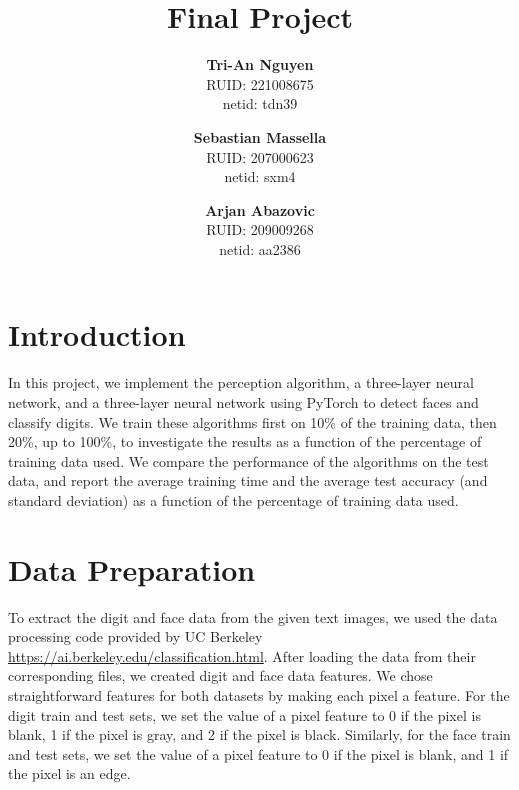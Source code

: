 \documentclass{article}
\begin{document}
\title{Final Project}
\date{}
\author{
\textbf{Tri-An Nguyen}\\
RUID: 221008675\\
netid: tdn39
\and
\textbf{Sebastian Massella}\\
RUID: 207000623\\
netid: sxm4
\and
\textbf{Arjan Abazovic}\\
RUID: 209009268\\
netid: aa2386}
\maketitle 

\section*{Introduction}
In this project, we implement the perception algorithm, a three-layer neural network, and a three-layer neural network using PyTorch to detect faces and classify digits. We train these algorithms first on 10\% of the training data, then 20\%, up to 100\%, to investigate the results as a function of the percentage of training data used. We compare the performance of the algorithms on the test data, and report the average training time and the average test accuracy (and standard deviation) as a function of the percentage of training data used.
\section*{Data Preparation}
To extract the digit and face data from the given text images, we used the data processing code provided by UC Berkeley \url{https://ai.berkeley.edu/classification.html}. After loading the data from their corresponding files, we created digit and face data features. We chose straightforward features for both datasets by making each pixel a feature. For the digit train and test sets, we set the value of a pixel feature to 0 if the pixel is blank, 1 if the pixel is gray, and 2 if the pixel is black. Similarly, for the face train and test sets, we set the value of a pixel feature to 0 if the pixel is blank, and 1 if the pixel is an edge.
\end{document}
